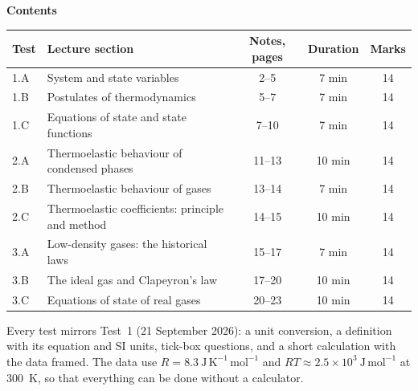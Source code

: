 \documentclass{ibetest}
\begin{document}
\vspace{6mm}
{\sffamily\bfseries Contents}\par\vspace{2mm}
\begin{center}
\begin{tabular}{@{}l l c c c@{}}
\hline
\textbf{Test} & \textbf{Lecture section} & \textbf{Notes, pages} & \textbf{Duration} &
\textbf{Marks}\\ \hline
1.A & System and state variables                      & 2--5   & 7 min  & 14\\
1.B & Postulates of thermodynamics                    & 5--7   & 7 min  & 14\\
1.C & Equations of state and state functions          & 7--10  & 7 min  & 14\\
2.A & Thermoelastic behaviour of condensed phases     & 11--13 & 10 min & 14\\
2.B & Thermoelastic behaviour of gases                & 13--14 & 7 min  & 14\\
2.C & Thermoelastic coefficients: principle and method & 14--15 & 10 min & 14\\
3.A & Low-density gases: the historical laws          & 15--17 & 7 min  & 14\\
3.B & The ideal gas and Clapeyron's law               & 17--20 & 10 min & 14\\
3.C & Equations of state of real gases                & 20--23 & 10 min & 14\\ \hline
\end{tabular}
\end{center}

\vspace{6mm}
\begin{tcolorbox}[enhanced, colback=black!3, colframe=black!45, boxrule=0.4pt, arc=1mm,
  fontupper=\small]
Every test mirrors Test~1 (21 September 2026): a unit conversion, a definition with its
equation and SI units, tick-box questions, and a short calculation with the data framed. The
data use $R = 8.3\ \mathrm{J\,K^{-1}\,mol^{-1}}$ and $RT\approx2.5\times10^{3}\
\mathrm{J\,mol^{-1}}$ at 300~K, so that everything can be done without a calculator.
\end{tcolorbox}
\end{document}
